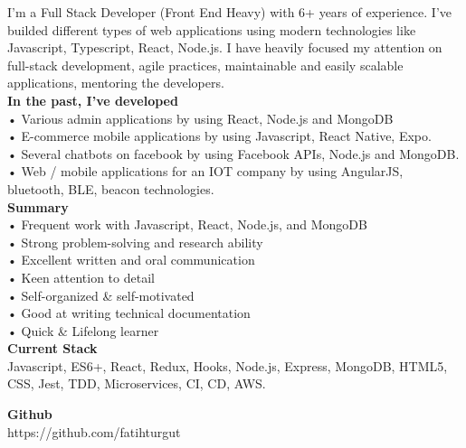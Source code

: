 

\begin{cvparagraph}

I'm a Full Stack Developer (Front End Heavy) with 6+ years of experience. I've builded different types of web applications using modern technologies like Javascript, Typescript, React, Node.js. I have heavily focused my attention on full-stack development, agile practices, maintainable and easily scalable applications, mentoring the developers. \\

\textbf {In the past, I've developed} \\
• Various admin applications by using React, Node.js and MongoDB \\
• E-commerce mobile applications by using Javascript, React Native, Expo. \\
• Several chatbots on facebook by using Facebook APIs, Node.js and MongoDB. \\
• Web / mobile applications for an IOT company by using AngularJS, bluetooth, BLE, beacon technologies. \\

\textbf {Summary} \\
• Frequent work with Javascript, React, Node.js, and MongoDB \\
• Strong problem-solving and research ability \\
• Excellent written and oral communication \\
• Keen attention to detail \\
• Self-organized {\&} self-motivated \\
• Good at writing technical documentation \\
• Quick {\&} Lifelong learner \\


\textbf {Current Stack} \\
Javascript, ES6+, React, Redux, Hooks, Node.js, Express, MongoDB, HTML5, CSS, Jest, TDD, Microservices, CI, CD, AWS.

\textbf {Github} \\
https://github.com/fatihturgut

\end{cvparagraph}
